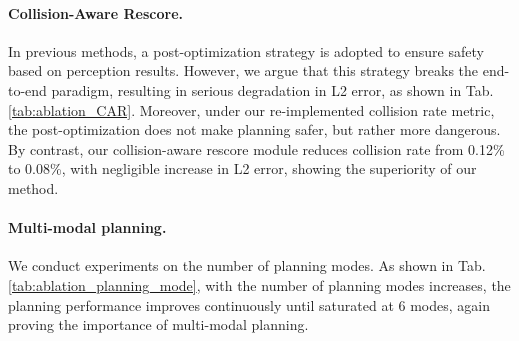\paragraph{Collision-Aware Rescore.} In previous methods\cite{uniad, graphad}, a post-optimization strategy is adopted to ensure safety based on perception results. However, we argue that this strategy breaks the end-to-end paradigm, resulting in serious degradation in L2 error, as shown in Tab. \ref{tab:ablation_CAR}. Moreover, under our re-implemented collision rate metric, the post-optimization does not make planning safer, but rather more dangerous. By contrast, our collision-aware rescore module reduces collision rate from 0.12\% to 0.08\%, with negligible increase in L2 error, showing the superiority of our method.

\paragraph{Multi-modal planning.}
We conduct experiments on the number of planning modes. As shown in Tab. \ref{tab:ablation_planning_mode}, with the number of planning modes increases, the planning performance improves continuously until saturated at 6 modes, again proving the importance of multi-modal planning.






% 
